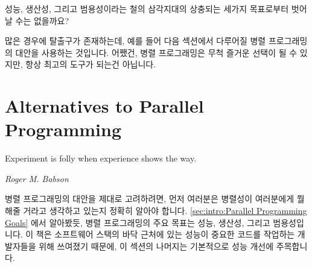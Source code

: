 성능, 생산성, 그리고 범용성이라는 철의 삼각지대의 상충되는 세가지 목표로부터
벗어날 수는 없을까요?

많은 경우에 탈출구가 존재하는데, 예를 들어 다음 섹션에서 다루어질 병렬
프로그래밍의 대안을 사용하는 것입니다.
어쨌건, 병렬 프로그래밍은 무척 즐거운 선택이 될 수 있지만, 항상 최고의 도구가
되는건 아닙니다.

\section{Alternatives to Parallel Programming}
\label{sec:intro:Alternatives to Parallel Programming}
%
\epigraph{Experiment is folly when experience shows the way.}
	 {\emph{Roger M. Babson}}

병렬 프로그래밍의 대안을 제대로 고려하려면, 먼저 여러분은 병렬성이 여러분에게
뭘 해줄 거라고 생각하고 있는지 정확히 알아야 합니다.
\cref{sec:intro:Parallel Programming Goals} 에서 알아봤듯, 병렬 프로그래밍의
주요 목표는 성능, 생산성, 그리고 범용성입니다.
이 책은 소프트웨어 스택의 바닥 근처에 있는 성능이 중요한 코드를 작업하는
개발자들을 위해 쓰여졌기 때문에, 이 섹션의 나머지는 기본적으로 성능 개선에
주목합니다.

